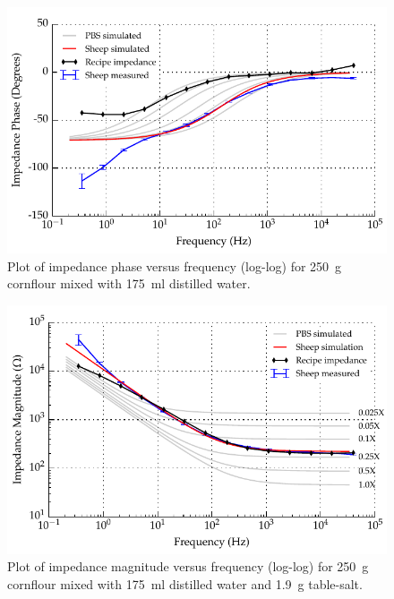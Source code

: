 \begin{figure}
    \centering
    \includegraphics[width=\textwidth]{content/pt2/graphics/run14_170ml-distilledWater_250g-cornflour_ZVsF_graph_phase}
    \caption{\label{fig:recipe_cornflour_phase}Plot of impedance phase versus frequency (log-log) for \SI{250}{\gram} cornflour mixed with \SI{175}{\milli\litre} distilled water.}
\end{figure}

\begin{figure}
    \centering
    \includegraphics[width=\textwidth]{content/pt2/graphics/run14_175ml-distilledWater_250g-cornflour_1g9-salt_ZVsF_graph_mag}
    \caption{\label{fig:recipe_cornflour_salt_mag}Plot of impedance magnitude versus frequency (log-log) for \SI{250}{\gram} cornflour mixed with \SI{175}{\milli\litre} distilled water and \SI{1.9}{\gram} table-salt.}
\end{figure}

